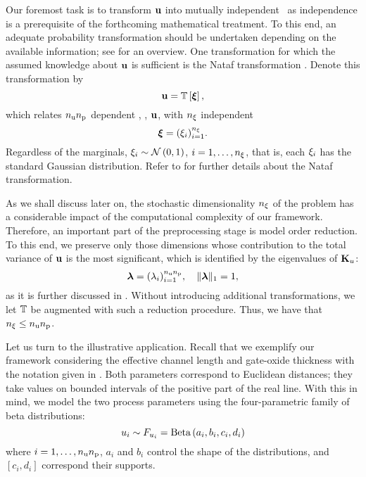 Our foremost task is to transform $\mathbf{u}$ into mutually independent \rvs\ as independence is a prerequisite of the forthcoming mathematical treatment.
To this end, an adequate probability transformation should be undertaken depending on the available information; see \cite{eldred2008} for an overview.
One transformation for which the assumed knowledge about $\mathbf{u}$ is sufficient is the Nataf transformation \cite{li2008}.
Denote this transformation by
\begin{equation} \elab{probability-transformation}
  \vu = \transformation{\vz},
\end{equation}
which relates ${n_\text{u}} {n_\text{p}}$ dependent \rvs, \ie, $\mathbf{u}$, with ${n_\xi}$ independent \rvs
\begin{equation} \elab{independent-random-variables}
  \vz = (\z_i)_{i = 1}^\nvars.
\end{equation}
Regardless of the marginals, $\xi_i \sim \mathcal{N}\left( 0, 1 \right)$, $i = 1, \dots, {n_\xi}$, that is, each $\xi_i$ has the standard Gaussian distribution.
Refer to  for further details about the Nataf transformation.

As we shall discuss later on, the stochastic dimensionality ${n_\xi}$ of the problem has a considerable impact of the computational complexity of our framework.
Therefore, an important part of the preprocessing stage is model order reduction.
To this end, we preserve only those dimensions whose contribution to the total variance of $\mathbf{u}$ is the most significant, which is identified by the eigenvalues of $\mathbf{K}_u$:
\begin{equation} \elab{dimension-contribution}
  \dimensionContribution = (\lambda_i)_{i = 1}^{\nparams \nprocs}, \hspace{1em} \norm[1]{\dimensionContribution} = 1,
\end{equation}
as it is further discussed in .
Without introducing additional transformations, we let $\transformation$ be augmented with such a reduction procedure.
Thus, we have that ${n_\xi} \leq {n_\text{u}} {n_\text{p}}$.

Let us turn to the illustrative application.
Recall that we exemplify our framework considering the effective channel length and gate-oxide thickness with the notation given in .
Both parameters correspond to Euclidean distances; they take values on bounded intervals of the positive part of the real line.
With this in mind, we model the two process parameters using the four-parametric family of beta distributions:
\begin{equation*}
  u_i \sim F_{u_i} = \text{Beta}\left( a_i, b_i, c_i, d_i \right)
\end{equation*}
where $i = 1, \dots, {n_\text{u}} {n_\text{p}}$, $a_i$ and $b_i$ control the shape of the distributions, and $[ c_i, d_i ]$ correspond their supports.

